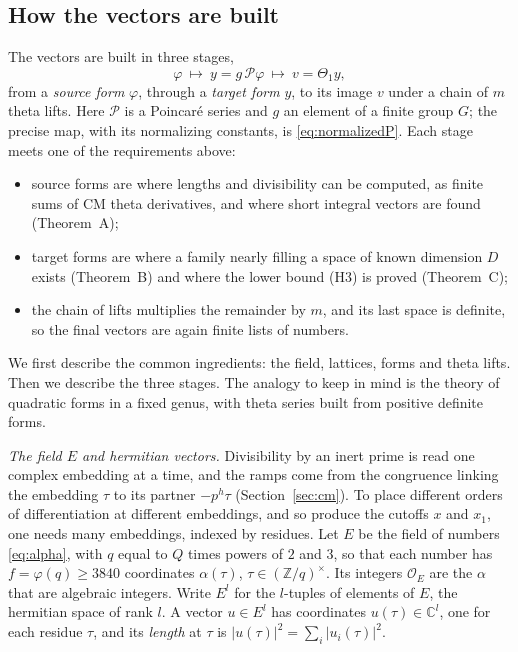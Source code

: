 \documentclass[11pt]{amsart}
\numberwithin{equation}{section}
\theoremstyle{definition}
\theoremstyle{remark}
\newcommand{\Z}{\mathbb Z}
\newcommand{\C}{\mathbb C}
\newcommand{\cO}{\mathcal O}
\begin{document}
\subsection*{How the vectors are built}
The vectors are built in three stages,
\begin{equation}\label{eq:pipeline}
 \varphi\ \longmapsto\ y=g\,\mathcal P\varphi\ \longmapsto\ v=\Theta_1y,
\end{equation}
from a \emph{source form} $\varphi$, through a \emph{target form} $y$, to its image $v$ under a chain of $m$ theta lifts. Here $\mathcal P$ is a Poincar\'e series and $g$ an element of a finite group $G$; the precise map, with its normalizing constants, is \eqref{eq:normalizedP}. Each stage meets one of the requirements above:
\begin{itemize}[leftmargin=2em]
\item source forms are where lengths and divisibility can be computed, as finite sums of CM theta derivatives, and where short integral vectors are found (Theorem~A);
\item target forms are where a family nearly filling a space of known dimension $D$ exists (Theorem~B) and where the lower bound (H3) is proved (Theorem~C);
\item the chain of lifts multiplies the remainder by $m$, and its last space is definite, so the final vectors are again finite lists of numbers.
\end{itemize}
We first describe the common ingredients: the field, lattices, forms and theta lifts. Then we describe the three stages. The analogy to keep in mind is the theory of quadratic forms in a fixed genus, with theta series built from positive definite forms.

\emph{The field $E$ and hermitian vectors.} Divisibility by an inert prime is read one complex embedding at a time, and the ramps come from the congruence linking the embedding $\tau$ to its partner $-p^h\tau$ (Section~\ref{sec:cm}). To place different orders of differentiation at different embeddings, and so produce the cutoffs $x$ and $x_1$, one needs many embeddings, indexed by residues. Let $E$ be the field of numbers \eqref{eq:alpha}, with $q$ equal to $Q$ times powers of $2$ and $3$, so that each number has $f=\varphi(q)\ge3840$ coordinates $\alpha(\tau)$, $\tau\in(\Z/q)^\times$. Its integers $\cO_E$ are the $\alpha$ that are algebraic integers. Write $E^l$ for the $l$-tuples of elements of $E$, the hermitian space of rank $l$. A vector $u\in E^l$ has coordinates $u(\tau)\in\C^l$, one for each residue $\tau$, and its \emph{length} at $\tau$ is $|u(\tau)|^2=\sum_i|u_i(\tau)|^2$.
\end{document}
